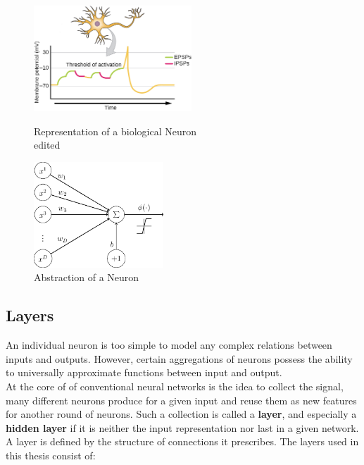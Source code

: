 \begin{figure}
	\centering
	\begin{minipage}{0.45\textwidth}
		\centering
		\includegraphics[height=150px]{gfx/Biological_Neuron_edited.jpg}
		\caption{Representation of a biological Neuron\\
			\cite{biology} edited}
		\label{fig:neuron1}
	\end{minipage}\hfill
	\begin{minipage}{0.45\textwidth}
		\centering
		\includegraphics[height=150px]{gfx/Abstract_Neuron.png}
		\caption{Abstraction of a Neuron\\
			\cite{abstract_neuron}}
		\label{fig:neuron2}
	\end{minipage}
\end{figure}

\subsection{Layers}
An individual neuron is too simple to model any complex relations between inputs and outputs. However, certain aggregations of neurons possess the ability to universally approximate functions between input and output.\cite{Approximator}\\
At the core of of conventional neural networks is the idea to collect the signal, many different neurons produce for a given input and reuse them as new features for another round
of neurons. Such a collection is called a \textbf{layer}, and especially a \textbf{hidden layer} if it is neither the input representation nor last in a given network.
A layer is defined by the structure of connections it prescribes. The layers used in this thesis consist of:

